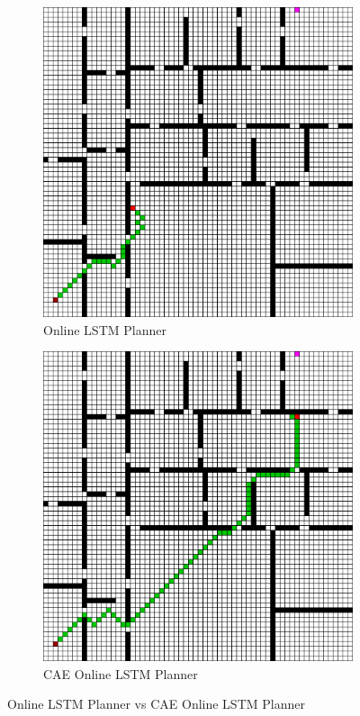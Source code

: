 \begin{figure}[h!]
  \centerfloat
  \begin{subfigure}[b]{0.40\linewidth}
    \includegraphics[width=\linewidth]{images/lstm_4_all.png}
     \caption{Online LSTM Planner}
  \end{subfigure}
  \hfill
  \begin{subfigure}[b]{0.40\linewidth}
    \includegraphics[width=\linewidth]{images/cae_lstm_4_block.png}
     \caption{CAE Online LSTM Planner}
  \end{subfigure}
  \caption{Online LSTM Planner vs CAE Online LSTM Planner}
  \label{fig: cae lstm vs lstm}
\end{figure}

